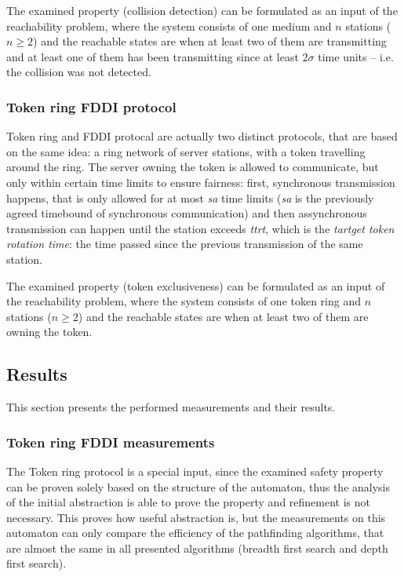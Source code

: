The examined property (collision detection) can be formulated as an input of the reachability problem, where the system consists of one medium and $n$ stations ($n \geq 2$) and the reachable states are when at least two of them are transmitting and at least one of them has been transmitting since at least $2\sigma$ time units -- i.e. the collision was not detected.

\subsubsection{Token ring FDDI protocol}

Token ring and FDDI protocal are actually two distinct protocols, that are based on the same idea: a ring network of server stations, with a token travelling around the ring. The server owning the token is allowed to communicate, but only within certain time limits to ensure fairness: first, synchronous transmission happens, that is only allowed for at most \emph{sa} time limits (\emph{sa} is the previously agreed timebound of synchronous communication) and then assynchronous transmission can happen until the station exceeds \emph{ttrt}, which is the \emph{tartget token rotation time}: the time passed since the previous transmission of the same station.

The examined property (token exclusiveness) can be formulated as an input of the reachability problem, where the system consists of one token ring and $n$ stations ($n \geq 2$) and the reachable states are when at least two of them are owning the token.

\subsection{Results}

This section presents the performed measurements and their results.

\subsubsection{Token ring FDDI measurements}

The Token ring protocol is a special input, since the examined safety property can be proven solely based on the structure of the automaton, thus the analysis of the initial abstraction is able to prove the property and refinement is not necessary. This proves how useful abstraction is, but the measurements on this automaton can only compare the efficiency of the pathfinding algorithms, that are almost the same in all presented algorithms (breadth first search and depth first search).

